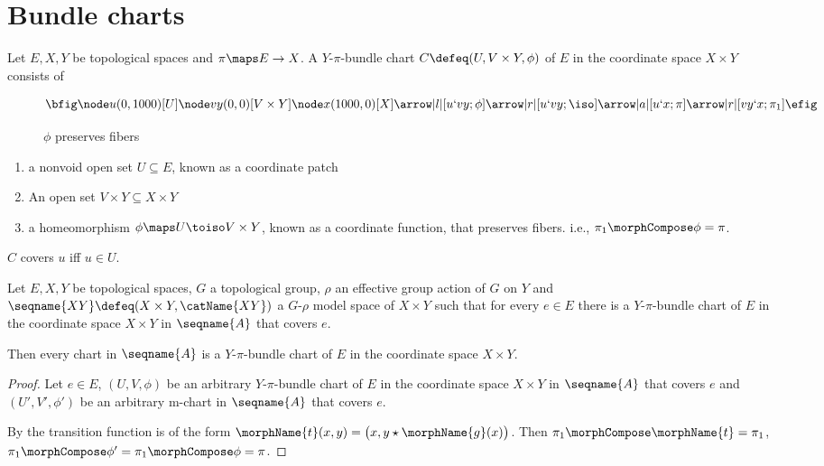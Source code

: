 \documentclass{article}
\begin{document}
\section{Bundle charts}
{
  \showlabelsinline
  \label{sec:buncharts}
}
\begin{definition}
\label{def:Ypichart}
Let $E,X,Y$ be topological spaces and \linebreak
\nobreaks
{{
  $\pi \maps E \to X$.
}}
A $Y$-$\pi$-bundle chart $C \defeq (U, V \times Y, \phi)$ of $E$ in the
coordinate space $X \times Y$ consists of

\begin{figure}[ht]
\[ \bfig
\node u(0,1000)[U]
\node vy(0,0)[V \times Y]
\node x(1000,0)[X]
\arrow |l|[u`vy;\phi]
\arrow |r|[u`vy;\iso]
\arrow |a|[u`x;\pi]
\arrow |r|[vy`x;\pi_1]
\efig \]
\caption{$\phi$ preserves fibers}
\label{fig:Ypichart}
\end{figure}

\begin{enumerate}
\item a nonvoid open set $U \subseteq E$, known as a coordinate patch
\item An open set $V \times Y \subseteq X \times Y$
\item a homeomorphism $\phi \maps U \toiso V \times Y$, known as a
coordinate function, that preserves fibers. i.e.,
$\pi_1 \morphCompose \phi = \pi$.
\end{enumerate}

$C$ covers $u$ iff $u \in U$.
\end{definition}

\begin{lemma}
\label{lem:Ypichart}
Let $E,X,Y$ be topological spaces,
$G$ a topological group, $\rho$ an effective group action of $G$ on
$Y$
and $\seqname{XY} \defeq (X \times Y, \catName{XY})$
a $G$-$\rho$ model space of $X \times Y$ such that
for every
$e \in E$ there is a $Y$-$\pi$-bundle chart of $E$ in the coordinate
space $X \times Y$ in $\seqname{A}$ that covers $e$.

Then every chart in $\seqname{A}$ is a $Y$-$\pi$-bundle chart of $E$ in
the coordinate space $X \times Y$.

\begin{proof}
Let $e \in E$, $(U,V,\phi)$ be an arbitrary $Y$-$\pi$-bundle chart of
$E$ in the coordinate space $X \times Y$ in $\seqname{A}$ that covers
$e$ and $(U',V',\phi')$ be an arbitrary m-chart in $\seqname{A}$ that
covers $e$.

By  the transition function is of the form
$\morphName{t}(x, y) = \bigl ( x, y \star \morphName{g}(x) \bigr )$.
Then $\pi_1 \morphCompose \morphName{t} = \pi_1$,
$\pi_1 \morphCompose \phi' = \pi_1 \morphCompose \phi =\pi$.
\end{proof}
\end{lemma}
\end{document}
